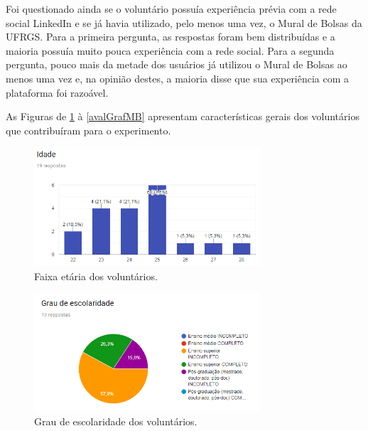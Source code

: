 Foi questionado ainda se o voluntário possuía experiência prévia com a rede social LinkedIn e se já havia utilizado, pelo menos uma vez, o Mural de Bolsas da UFRGS. Para a primeira pergunta, as respostas foram bem distribuídas e a maioria possuía muito pouca experiência com a rede social. Para a segunda pergunta, pouco mais da metade dos usuários já utilizou o Mural de Bolsas ao menos uma vez e, na opinião destes, a maioria disse que sua experiência com a plataforma foi razoável.

As Figuras de \ref{avalGrafIdade} à \ref{avalGrafMB} apresentam características gerais dos voluntários que contribuíram para o experimento.

\begin{figure}[h]
    \caption{Faixa etária dos voluntários.}
       	\begin{center}
            \includegraphics[width=0.75\textwidth]{figuras/avaliacao/idade.png}
        \end{center}
    \label{avalGrafIdade}
\end{figure}    

\begin{figure}[h]
    \caption{Grau de escolaridade dos voluntários.}
       	\begin{center}
            \includegraphics[width=0.75\textwidth]{figuras/avaliacao/escolaridade.png}
        \end{center}
    \label{avalGrafEscolaridade}
\end{figure} 

